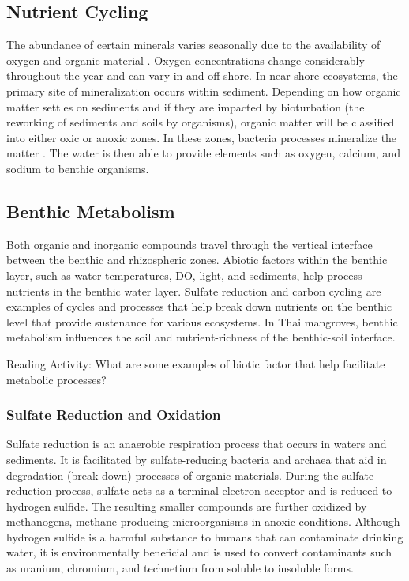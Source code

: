 \subsection{Nutrient Cycling}
The abundance of certain minerals varies seasonally due to the availability of oxygen and organic material \citep{friedrich2002benthic}. Oxygen concentrations change considerably throughout the year and can vary in and off shore. In near-shore ecosystems, the primary site of mineralization occurs within sediment. Depending on how organic matter settles on sediments and if they are impacted by bioturbation (the reworking of sediments and soils by organisms), organic matter will be classified into either oxic or anoxic zones. In these zones, bacteria processes mineralize the matter \citep{spooner2009benthic}. The water is then able to provide elements such as oxygen, calcium, and sodium to benthic organisms.

\subsection{Benthic Metabolism}

Both organic and inorganic compounds travel through the vertical interface between the benthic and rhizospheric zones. Abiotic factors within the benthic layer, such as water temperatures, DO, light, and sediments, help process nutrients in the benthic water layer. Sulfate reduction and carbon cycling are examples of cycles and processes that help break down nutrients on the benthic level that provide sustenance for various ecosystems. In Thai mangroves, benthic metabolism influences the soil and nutrient-richness of the benthic-soil interface.

Reading Activity: What are some examples of biotic factor that help facilitate metabolic processes?

\subsubsection{Sulfate Reduction and Oxidation}
Sulfate reduction is an anaerobic respiration process that occurs in waters and sediments. It is facilitated by sulfate-reducing bacteria and archaea that aid in degradation (break-down) processes of organic materials. During the sulfate reduction process, sulfate acts as a terminal electron acceptor and is reduced to hydrogen sulfide. The resulting smaller compounds are further oxidized by methanogens, methane-producing microorganisms in anoxic conditions. Although hydrogen sulfide is a harmful substance to humans that can contaminate drinking water, it is environmentally beneficial and is used to convert contaminants such as uranium, chromium, and technetium from soluble to insoluble forms. 

